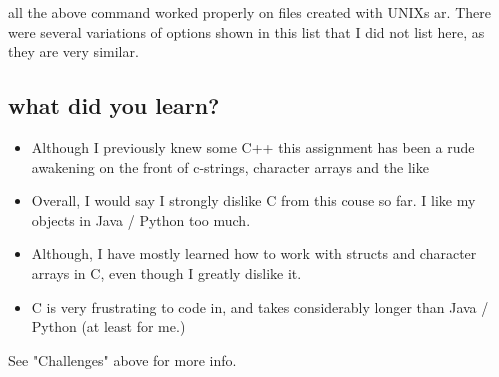 \documentclass[letterpaper,10pt,titlepage]{article}
\begin{document}
all the above command worked properly on files created with UNIXs ar.  There were several variations of options shown in this list that I did not list here, as they are very similar.

\subsection{what did you learn?}

\begin{itemize}
\item Although I previously knew some C++ this assignment has been a rude awakening on the front of c-strings, character arrays and the like
\item Overall, I would say I strongly dislike C from this couse so far.  I like my objects in Java / Python too much.
\item Although, I have mostly learned how to work with structs and character arrays in C, even though I greatly dislike it.
\item C is very frustrating to code in, and takes considerably longer than Java / Python (at least for me.)
\end{itemize}

See "Challenges" above for more info.
\end{document}
